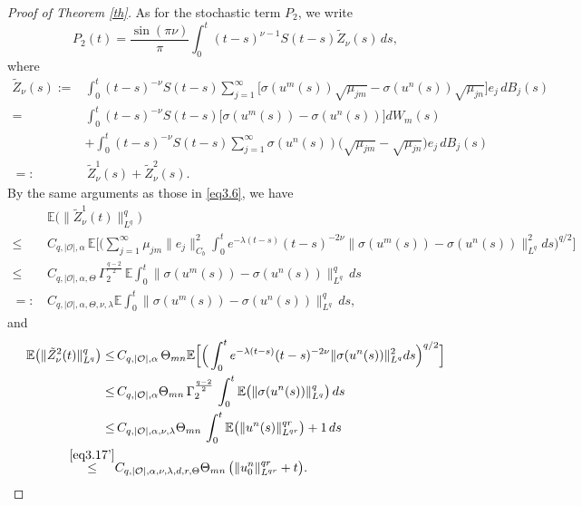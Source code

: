 \documentclass[10pt]{article}
\numberwithin{figure}{section}
\numberwithin{equation}{section}
\newcommand{\0}{{\theta}}
\def\lam{\lambda}
\def\~{\tilde}
\def\E{\mathbb{E}}
\begin{document}
\begin{proof}[Proof of Theorem \ref{th}]
\vs
As for the stochastic term $P_2$, we write 
$$P_2(t)=\frac{\sin(\pi\nu)}{\pi}\int_0^{t}(t-s)^{\nu-1}S(t-s)\~Z_\nu(s)\,ds,$$
where 
$$\begin{aligned}\~Z_\nu(s):=&\int_0^t(t-s)^{-\nu}S(t-s)\sum_{j=1}^\infty\big[ \sigma(u^m(s))\sqrt{\mu_{jm}} - \sigma(u^n(s))\sqrt{\mu_{jn}} \big]e_j\, dB_j(s)\\
=&\int_0^t(t-s)^{-\nu}S(t-s)\big[ \sigma(u^m(s)) - \sigma(u^n(s)) \big]dW_m(s)\\
&+\int_0^t(t-s)^{-\nu}S(t-s)\sum_{j=1}^\infty\sigma(u^n(s))\big(\sqrt{\mu_{jm}} -\sqrt{\mu_{jn}}\big)e_j\, dB_j(s)\\
=:&\,\~Z_\nu^1(s)+\~Z_\nu^2(s).\end{aligned}$$
By the same arguments as those in \eqref{eq3.6}, we have 
\begin{equation*}
\begin{split}
&\,\mathbb{E}\big(\|\~Z_\nu^1(t)\|_{L^q}^q\big)\\
\le&\, C_{q,|\mathcal{O}|,\alpha} \, \mathbb{E}
   \Big[\Big( \sum_{j=1}^{\infty} \mu_{jm} \| e_j \|_{C_b}^2
          \int_0^{t} e^{-\lambda (t - s)} (t - s)^{-2\nu}
          \| \sigma(u^m(s)) - \sigma(u^n(s)) \|_{L^q}^2 ds\Big)^{q/2} \Big] \\
\le&\, C_{q,|\mathcal{O}|,\alpha,\Theta}\,
        \Gamma_2^{\frac{q-2}{2}}\,\E\int_0^t \| \sigma(u^m(s)) - \sigma(u^n(s)) \|_{L^q}^q \, ds\\
        =:&\,C_{q,|\mathcal{O}|,\alpha,\Theta,\nu,\lam}\E\int_0^t \| \sigma(u^m(s)) - \sigma(u^n(s)) \|_{L^q}^q \, ds,
\end{split}
\end{equation*}
and \begin{equation*}
\begin{split}
\mathbb{E}\big(\|\~Z_\nu^2(t)\|_{L^q}^q\big)
\le&\, C_{q,|\mathcal{O}|,\alpha} \, \Theta_{mn}\mathbb{E}
          \Big[\Big(\int_0^{t} e^{-\lambda (t - s)} (t - s)^{-2\nu}
          \|\sigma(u^n(s)) \|_{L^q}^2 ds\Big)^{q/2}\Big] \\
\le&\, C_{q,|\mathcal{O}|,\alpha}\Theta_{mn}\,
        \Gamma_2^{\frac{q-2}{2}}\,\int_0^t \E\big(\|\sigma(u^n(s)) \|_{L^q}^q\big) \, ds\\
\le &\,C_{q,|\mathcal{O}|,\alpha,\nu,\lam}\Theta_{mn}\,
\int_0^t\E\big(\|u^n(s) \|_{L^{qr}}^{qr}\big)+1 \, ds\\
\stackrel{\eqref{eq3.17'}}{\le}&C_{q,|\mathcal{O}|,\alpha,\nu,\lam,d,r,\Theta}\Theta_{mn}\,\big(\|u_0^n\|_{L^{qr}}^{qr}+t \big).
\end{split}
\end{equation*}

\end{proof}
\end{document}
